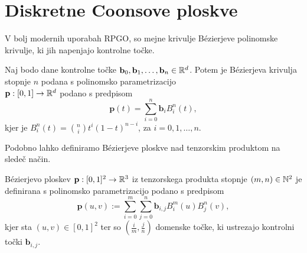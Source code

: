 \documentclass[a4paper,12pt]{article}
\begin{document}
\section{Diskretne Coonsove ploskve}
V bolj modernih uporabah RPGO, so mejne krivulje Bézierjeve polinomske krivulje, 
ki jih napenjajo kontrolne točke. 
\begin{definicija}
    Naj bodo dane kontrolne točke $\mathbf{b}_0, \mathbf{b}_1, \dots, \mathbf{b}_n \in \mathbb{R}^d$. 
    Potem je Bézierjeva krivulja stopnje $n$ podana s polinomsko parametrizacijo \\ $\mathbf{p}: [0,1] \rightarrow \mathbb{R}^d$ podano s predpisom 
    $$\mathbf{p}(t) = \sum_{i=0}^n \mathbf{b}_{i} B_i^n(t),$$
    kjer je $B_i^n(t) = \binom{n}{i} t^i (1-t)^{n-i}$, za $i = 0, 1,\dots,n$. 
\end{definicija}

Podobno lahko definiramo Bézierjeve ploskve nad tenzorskim produktom
na sledeč način.

\begin{definicija}
    Bézierjevo ploskev $\mathbf{p} : [0,1]^2 \rightarrow \mathbb{R}^3$ iz tenzorskega produkta stopnje 
    $(m, n) \in \mathbb{N}^2$ je definirana s polinomsko parametrizacijo podano s predpisom
    $$\mathbf{p}(u,v) := \sum_{i=0}^m \sum_{j=0}^n \mathbf{b}_{i,j} B_i^m(u)B_j^n(v),$$
    kjer sta $(u,v) \in [0,1]^2$ ter so $(\frac{i}{m}, \frac{j}{n})$
    domenske točke, ki ustrezajo kontrolni točki $\mathbf{b}_{i,j}$.
\end{definicija}
\end{document}
